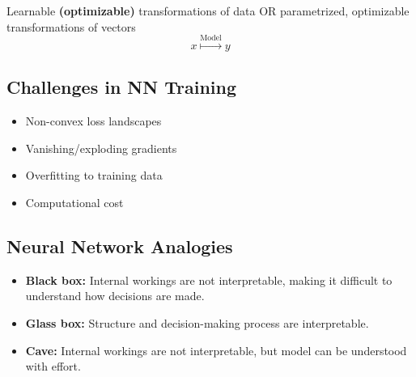 \begin{definition}
    Learnable \textbf{(optimizable)} transformations of data OR parametrized, optimizable transformations of vectors 
    \begin{equation}
        x \overset{\text{Model}}{\mapsto} y
    \end{equation}
\end{definition}

\subsection{Challenges in NN Training}
\begin{notes}
    \begin{itemize}
        \item Non-convex loss landscapes
        \item Vanishing/exploding gradients
        \item Overfitting to training data
        \item Computational cost
    \end{itemize}
\end{notes}

\subsection{Neural Network Analogies}
\begin{notes}
    \begin{itemize}
        \item \textbf{Black box:} Internal workings are not interpretable, making it difficult to understand how decisions are made.
        \item \textbf{Glass box:} Structure and decision-making process are interpretable.
        \item \textbf{Cave:} Internal workings are not interpretable, but model can be understood with effort. 
    \end{itemize}
\end{notes}

\newpage

